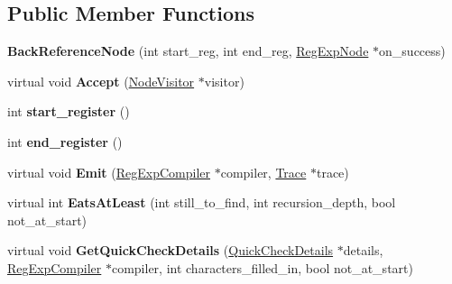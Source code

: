 \subsection*{Public Member Functions}
\begin{DoxyCompactItemize}
\item 
\hypertarget{classv8_1_1internal_1_1_back_reference_node_aecafde1109f696d1eb80499c9cd04b08}{}{\bfseries Back\+Reference\+Node} (int start\+\_\+reg, int end\+\_\+reg, \hyperlink{classv8_1_1internal_1_1_reg_exp_node}{Reg\+Exp\+Node} $\ast$on\+\_\+success)\label{classv8_1_1internal_1_1_back_reference_node_aecafde1109f696d1eb80499c9cd04b08}

\item 
\hypertarget{classv8_1_1internal_1_1_back_reference_node_af0f0870c3f4113d8ad375a7c9436ddff}{}virtual void {\bfseries Accept} (\hyperlink{classv8_1_1internal_1_1_node_visitor}{Node\+Visitor} $\ast$visitor)\label{classv8_1_1internal_1_1_back_reference_node_af0f0870c3f4113d8ad375a7c9436ddff}

\item 
\hypertarget{classv8_1_1internal_1_1_back_reference_node_a5898f97fe856e743638d8a4db8aae160}{}int {\bfseries start\+\_\+register} ()\label{classv8_1_1internal_1_1_back_reference_node_a5898f97fe856e743638d8a4db8aae160}

\item 
\hypertarget{classv8_1_1internal_1_1_back_reference_node_a9cc793e4e2defe8937482aa8d3462047}{}int {\bfseries end\+\_\+register} ()\label{classv8_1_1internal_1_1_back_reference_node_a9cc793e4e2defe8937482aa8d3462047}

\item 
\hypertarget{classv8_1_1internal_1_1_back_reference_node_a3d835aa391ea61ddde7ac75ba0ee9536}{}virtual void {\bfseries Emit} (\hyperlink{classv8_1_1internal_1_1_reg_exp_compiler}{Reg\+Exp\+Compiler} $\ast$compiler, \hyperlink{classv8_1_1internal_1_1_trace}{Trace} $\ast$trace)\label{classv8_1_1internal_1_1_back_reference_node_a3d835aa391ea61ddde7ac75ba0ee9536}

\item 
\hypertarget{classv8_1_1internal_1_1_back_reference_node_ae4b888f1d81c4a136c4b2a17e3bb6c62}{}virtual int {\bfseries Eats\+At\+Least} (int still\+\_\+to\+\_\+find, int recursion\+\_\+depth, bool not\+\_\+at\+\_\+start)\label{classv8_1_1internal_1_1_back_reference_node_ae4b888f1d81c4a136c4b2a17e3bb6c62}

\item 
\hypertarget{classv8_1_1internal_1_1_back_reference_node_a3df1913104dfd6615350926bdbfa2a73}{}virtual void {\bfseries Get\+Quick\+Check\+Details} (\hyperlink{classv8_1_1internal_1_1_quick_check_details}{Quick\+Check\+Details} $\ast$details, \hyperlink{classv8_1_1internal_1_1_reg_exp_compiler}{Reg\+Exp\+Compiler} $\ast$compiler, int characters\+\_\+filled\+\_\+in, bool not\+\_\+at\+\_\+start)\label{classv8_1_1internal_1_1_back_reference_node_a3df1913104dfd6615350926bdbfa2a73}


\end{DoxyCompactItemize}
